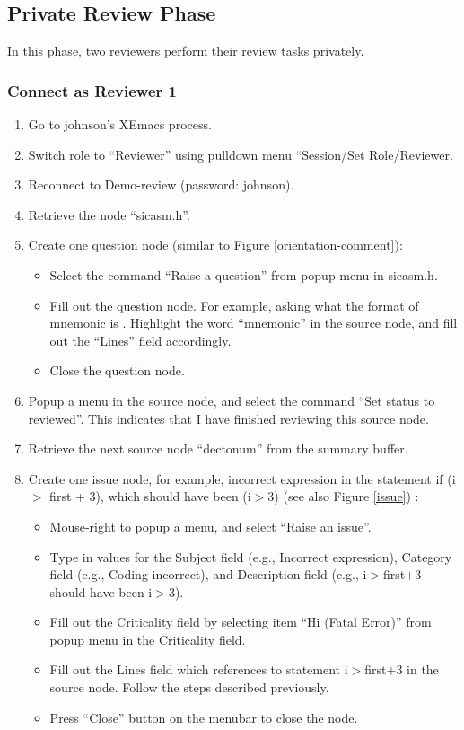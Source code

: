 \subsection{Private Review Phase}
In this phase, two reviewers perform their review tasks privately.

\subsubsection {Connect as Reviewer 1}
\begin{enumerate}
\item Go to johnson's XEmacs process.
\item Switch role to ``Reviewer'' using  pulldown menu
``Session/Set Role/Reviewer.
\item Reconnect to Demo-review (password: johnson).
\item Retrieve the node ``sicasm.h''.
\item Create one question node (similar to Figure \ref{orientation-comment}):
    \begin{itemize}
    \item Select the command ``Raise a question'' from popup menu in
    sicasm.h.
    \item Fill out the question node. For example, asking what the format
    of mnemonic is . Highlight the word ``mnemonic'' in the
    source node, and fill out the ``Lines'' field accordingly. 
    \item Close the question node.
    \end{itemize}
\item Popup a menu in the source node, and select the command ``Set status
to reviewed''. This indicates that I have finished reviewing this
source node.
\item Retrieve the next source node ``dectonum'' from the summary buffer.
\item Create one issue node, for example, incorrect expression in the
statement if (i $>$ first + 3), which should have been (i$>$3) (see also
Figure \ref{issue}) :   
  \begin{itemize}
    \item Mouse-right to popup a menu, and select ``Raise an issue''.
    \item Type in values for the Subject field (e.g., Incorrect expression),
    Category field (e.g., Coding incorrect), and Description field
    (e.g., i$>$first+3  should have  been i$>$3).
    \item Fill out the Criticality field by selecting item ``Hi (Fatal
    Error)'' from popup menu in the Criticality field.
    \item Fill out the Lines field which references to statement i$>$first+3
    in the source node. Follow the steps described previously.
    \item Press ``Close'' button on the menubar to close the node.
  \end {itemize}


\end{enumerate}
